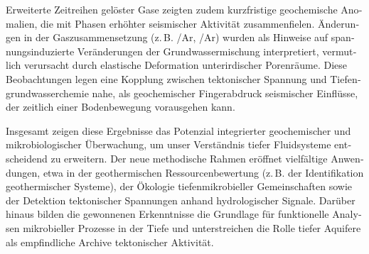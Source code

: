 \begin{otherlanguage}{ngerman}
Erweiterte Zeitreihen gelöster Gase zeigten zudem kurzfristige geochemische Anomalien, die mit Phasen erhöhter seismischer Aktivität zusammenfielen.
Änderungen in der Gaszusammensetzung (z.\,B. /Ar, /Ar) wurden als Hinweise auf spannungsinduzierte Veränderungen der Grundwassermischung interpretiert, vermutlich verursacht durch elastische Deformation unterirdischer Porenräume.
Diese Beobachtungen legen eine Kopplung zwischen tektonischer Spannung und Tiefengrundwasserchemie nahe, als geochemischer Fingerabdruck seismischer Einflüsse, der zeitlich einer Bodenbewegung vorausgehen kann.

Insgesamt zeigen diese Ergebnisse das Potenzial integrierter geochemischer und mikrobiologischer Überwachung, um unser Verständnis tiefer Fluidsysteme entscheidend zu erweitern.
Der neue methodische Rahmen eröffnet vielfältige Anwendungen, etwa in der geothermischen Ressourcenbewertung (z.\,B. der Identifikation geothermischer Systeme), der Ökologie tiefenmikrobieller Gemeinschaften sowie der Detektion tektonischer Spannungen anhand hydrologischer Signale.
Darüber hinaus bilden die gewonnenen Erkenntnisse die Grundlage für funktionelle Analysen mikrobieller Prozesse in der Tiefe und unterstreichen die Rolle tiefer Aquifere als empfindliche Archive tektonischer Aktivität.

\end{otherlanguage}

\endgroup

\vfill
